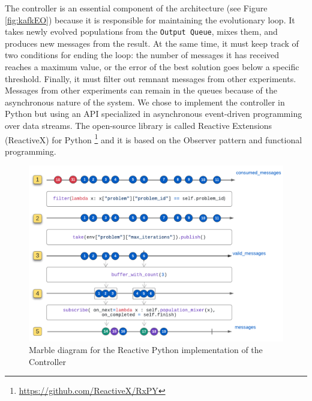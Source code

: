 \documentclass[review]{elsarticle}
\begin{document}
The controller is an essential component of the architecture (see Figure \ref{fig:kafkEO})
because it is responsible for maintaining the evolutionary loop. It takes newly
evolved populations from the \texttt{Output Queue}, mixes them, and produces new
messages from the result. At the same time, it must keep track of two conditions
for ending the loop: the number of messages it has received reaches a maximum
value, or the error of the best solution goes below a specific threshold.  Finally, it
must filter out remnant messages from other experiments. Messages from other
experiments can remain in the queues because of the asynchronous nature of the
system.  We chose to implement the controller in Python but using an API
specialized in asynchronous event-driven programming over data streams.  
The open-source library is called Reactive Extensions (ReactiveX) for Python 
\footnote{\url{https://github.com/ReactiveX/RxPY}} and it is based on the Observer 
pattern \cite{gamma1995design} and functional programming.

\begin{figure}[ht]
    \centering
    \includegraphics[width=\textwidth]{marble_controller}
    \caption{Marble diagram for the Reactive Python implementation of the Controller}
    \label{fig:marble_controller}
\end{figure}
\end{document}
